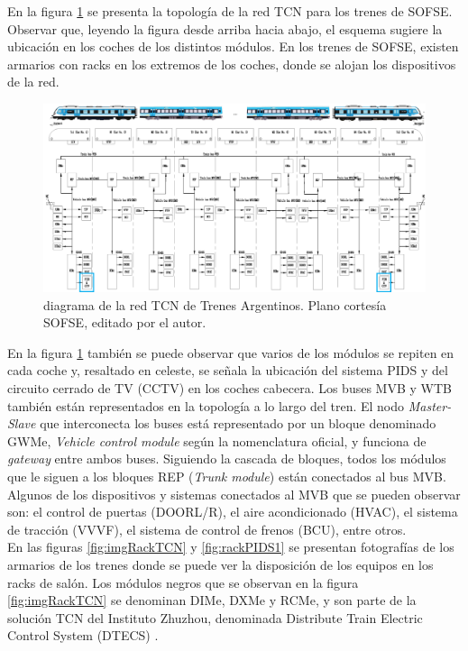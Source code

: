 En la figura \ref{fig:sofseTCN} se presenta la topología de la red TCN para los trenes de SOFSE. Observar que, leyendo la figura desde arriba hacia abajo, el esquema sugiere la ubicación en los coches de los distintos módulos. En los trenes de SOFSE, existen armarios con racks en los extremos de los coches, donde se alojan los dispositivos de la red.\\ \pagebreak

\begin{figure}[H]
	\includegraphics[width=1.8\textwidth, angle=90]{./Figures/diagramaTrenesArgentinosTCN2.png}
	\caption{diagrama de la red TCN de Trenes Argentinos. Plano cortesía SOFSE, editado por el autor.}
	\label{fig:sofseTCN}
\end{figure}


 En la figura \ref{fig:sofseTCN} también se puede observar que varios de los módulos se repiten en cada coche y, resaltado en celeste, se señala la ubicación del sistema PIDS y del circuito cerrado de TV (CCTV) en los coches cabecera. Los buses MVB y WTB también están representados en la topología a lo largo del tren. El nodo \textit{Master-Slave} que interconecta los buses está representado por un bloque denominado GWMe, \textit{Vehicle control module} según la nomenclatura oficial, y funciona de \textit{gateway} entre ambos buses. Siguiendo la cascada de bloques, todos los módulos que le siguen a los bloques REP (\textit{Trunk module}) están conectados al bus MVB. Algunos de los dispositivos y sistemas conectados al MVB que se pueden observar son: el control de puertas (DOORL/R), el aire acondicionado (HVAC), el sistema de tracción (VVVF), el sistema de control de frenos (BCU), entre otros. \\

En las figuras \ref{fig:imgRackTCN} y \ref{fig:rackPIDS1} se presentan fotografías de los armarios de los trenes donde se puede ver la disposición de los equipos en los racks de salón. Los módulos negros que se observan en la figura \ref{fig:imgRackTCN} se denominan DIMe, DXMe y RCMe, y son parte de la solución TCN del Instituto Zhuzhou, denominada Distribute Train Electric Control System (DTECS)  \cite{feng2016survey}. \\

